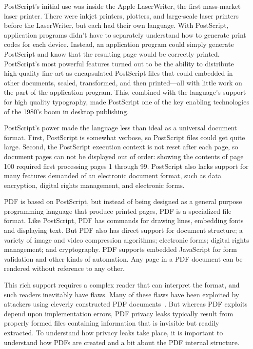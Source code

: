 PostScript's initial use was inside the Apple LaserWriter, the first
mass-market laser printer. There were inkjet printers, plotters, and
large-scale laser printers before the LaserWriter, but each 
had their own  language. With PostScript, application
programs didn't have to separately understand how to generate print
codes for each device. Instead, an
application program could simply generate PostScript and know that the
resulting page would be correctly printed. PostScript's most powerful features turned out to be
the ability to distribute high-quality line art as encapsulated
PostScript files that could embedded in other documents, scaled,
transformed, and then printed---all with little work on the part of
the application program. This, combined with the language's support
for high quality typography, made PostScript one of the key enabling
technologies of the 1980's boom in desktop publishing.

PostScript's power made the language
less than ideal as a universal document format. First, PostScript
 is somewhat verbose, so PostScript files could get quite
large. Second, the PostScript execution context is not reset
after each page, so document pages can not be displayed out of
order: showing the contents of page 100 required first processing pages 1 through 99. PostScript also
lacks support for many features demanded of an electronic document format,
such as data encryption, digital rights management, and electronic forms.

PDF is based on PostScript, but instead of being designed as a general
purpose programming language that produce printed pages, PDF is a
specialized file format. Like PostScript, PDF has
commands for drawing lines, embedding fonts and displaying text. But PDF also has direct support for
document structure; a variety of image and video compression
algorithms; electronic forms; digital rights management; and
cryptography. PDF supports embedded JavaScript for form validation
and other kinds of automation. Any page in a PDF document can be
rendered without reference to any other. 

This rich support requires a complex reader that can interpret the
format, and such readers inevitably have flaws. Many of these flaws
have been exploited by attackers using cleverly constructed
PDF documents~\cite{5705599}. But whereas PDF exploits depend upon
implementation errors, PDF privacy leaks typically result from
properly formed files  containing information that is invisible but
readily extracted. To understand how privacy leaks take place, it
is important to understand how PDFs are created and a bit
about the PDF internal structure.

